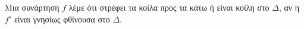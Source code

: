 Μια συνάρτηση $ f $ λέμε ότι στρέφει τα κοίλα προς τα κάτω ή είναι κοίλη στο $ \Delta $, αν η $ f' $ είναι γνησίως φθίνουσα στο $ \Delta $.
